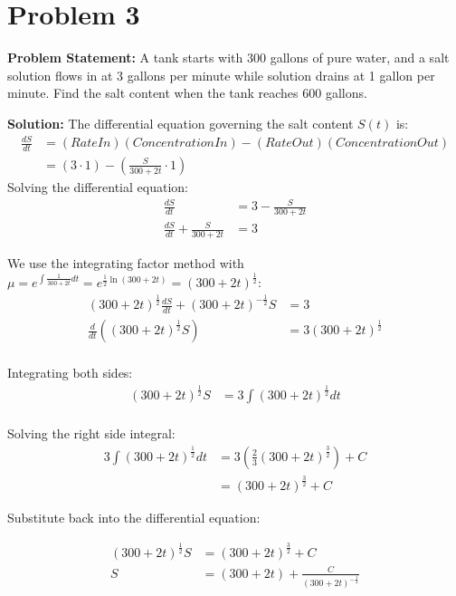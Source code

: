 \documentclass[12pt, letterpaper]{article}
\begin{document}
\section*{Problem 3}
\textbf{Problem Statement:}
A tank starts with 300 gallons of pure water, and a salt solution flows in at 3 gallons per minute while solution drains at 1 gallon per minute. Find the salt content when the tank reaches 600 gallons.

\textbf{Solution:}
The differential equation governing the salt content $S(t)$ is:
\begin{align*}
\frac{dS}{dt} &= (RateIn)(ConcentrationIn) - (RateOut)(ConcentrationOut) \\
&= (3 \cdot 1) - (\frac{S}{300+2t} \cdot 1) 
\end{align*}
Solving the differential equation:
\begin{align*}
\frac{dS}{dt} &= 3 - \frac{S}{300+2t} \\
\frac{dS}{dt} + \frac{S}{300+2t} &= 3
\end{align*}

We use the integrating factor method with $\mu = e^{\int \frac{1}{300+2t} dt} = e^{\frac{1}{2} \ln(300+2t)} = (300+2t)^{\frac{1}{2}}$:
\begin{align*}
(300+2t)^{\frac{1}{2}} \frac{dS}{dt} + (300+2t)^{-\frac{1}{2}}S &= 3 \\
\frac{d}{dt}((300+2t)^{\frac{1}{2}}S) &= 3(300+2t)^{\frac{1}{2}} \\
\end{align*}

Integrating both sides:
\begin{align*}
(300+2t)^{\frac{1}{2}}S &= 3 \int (300+2t)^{\frac{1}{2}} dt \\
\end{align*}

Solving the right side integral:
\begin{align*}
3 \int (300+2t)^{\frac{1}{2}} dt &= 3 \left( \frac{2}{3} (300+2t)^{\frac{3}{2}} \right) + C \\
&= (300+2t)^{\frac{3}{2}} + C
\end{align*}

Substitute back into the differential equation:

\begin{align*}
(300+2t)^{\frac{1}{2}}S &= (300+2t)^{\frac{3}{2}} + C \\
S &= (300+2t) + \frac{C}{(300+2t)^{-\frac{1}{2}}}
\end{align*}
\end{document}
